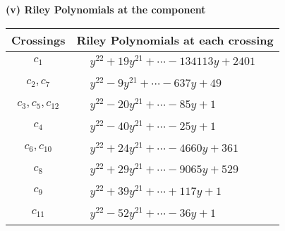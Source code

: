\documentclass[1p]{elsarticle_modified}
\theoremstyle{definition}
\begin{document}
\newpage\renewcommand{\arraystretch}{1}
\flushleft \textbf{(v) Riley Polynomials at the component}\newline \\
\begin{tabular}{m{50pt}|m{274pt}}
Crossings & \hspace{64pt}Riley Polynomials at each crossing \\
\hline $$\begin{aligned}c_{1}\end{aligned}$$&$\begin{aligned}
&y^{22}+19 y^{21}+\cdots-134113 y+2401
\end{aligned}$\\
\hline $$\begin{aligned}c_{2},c_{7}\end{aligned}$$&$\begin{aligned}
&y^{22}-9 y^{21}+\cdots-637 y+49
\end{aligned}$\\
\hline $$\begin{aligned}c_{3},c_{5},c_{12}\end{aligned}$$&$\begin{aligned}
&y^{22}-20 y^{21}+\cdots-85 y+1
\end{aligned}$\\
\hline $$\begin{aligned}c_{4}\end{aligned}$$&$\begin{aligned}
&y^{22}-40 y^{21}+\cdots-25 y+1
\end{aligned}$\\
\hline $$\begin{aligned}c_{6},c_{10}\end{aligned}$$&$\begin{aligned}
&y^{22}+24 y^{21}+\cdots-4660 y+361
\end{aligned}$\\
\hline $$\begin{aligned}c_{8}\end{aligned}$$&$\begin{aligned}
&y^{22}+29 y^{21}+\cdots-9065 y+529
\end{aligned}$\\
\hline $$\begin{aligned}c_{9}\end{aligned}$$&$\begin{aligned}
&y^{22}+39 y^{21}+\cdots+117 y+1
\end{aligned}$\\
\hline $$\begin{aligned}c_{11}\end{aligned}$$&$\begin{aligned}
&y^{22}-52 y^{21}+\cdots-36 y+1
\end{aligned}$\\
\hline
\end{tabular}\\~\\
\end{document}
